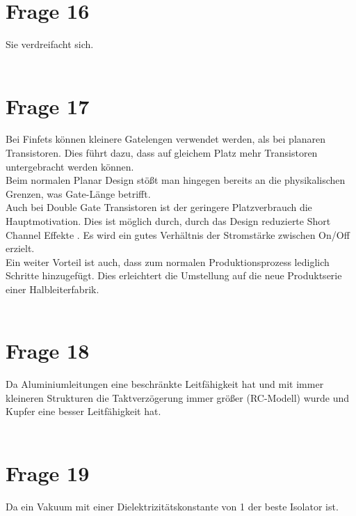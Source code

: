 \documentclass[a4paper]{scrartcl}
\begin{document}
\section*{Frage 16}
Sie verdreifacht sich.
~\\
~\\
\section*{Frage 17}
Bei Finfets können kleinere Gatelengen verwendet werden, als bei planaren Transistoren. Dies führt dazu, dass auf gleichem Platz mehr Transistoren untergebracht werden können.\\
Beim normalen Planar Design stößt man hingegen bereits an die physikalischen Grenzen, was Gate-Länge betrifft.\\
Auch bei Double Gate Transistoren ist der geringere Platzverbrauch die Hauptmotivation. Dies ist möglich durch, durch das Design reduzierte Short Channel Effekte . Es wird ein gutes Verhältnis der Stromstärke zwischen On/Off erzielt.\\
Ein weiter Vorteil ist auch, dass zum normalen Produktionsprozess lediglich Schritte hinzugefügt. Dies erleichtert die Umstellung auf die neue Produktserie einer Halbleiterfabrik.
~\\
~\\
\section*{Frage 18}
Da Aluminiumleitungen eine beschränkte Leitfähigkeit hat und mit immer kleineren Strukturen die Taktverzögerung immer größer (RC-Modell) wurde und Kupfer eine besser Leitfähigkeit hat.
~\\
~\\
\section*{Frage 19}
Da ein Vakuum mit einer Dielektrizitätskonstante von 1 der beste Isolator ist.
~\\
~\\
\end{document}
